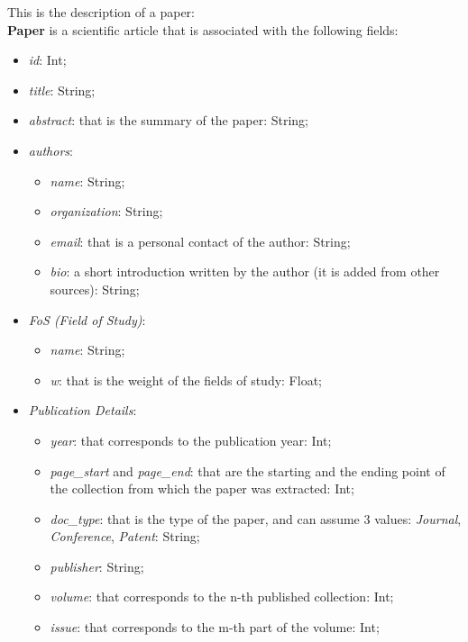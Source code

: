 \documentclass{Configuration_Files/PoliMi3i_thesis}
\begin{document}
This is the description of a paper:\\
\textbf{Paper} is a scientific article that is associated with the following fields:
    \begin{itemize}
        \item \textit{id}: Int;
        \item \textit{title}: String;
        \item \textit{abstract}: that is the summary of the paper: String;
        \item \textit{authors}:
            \begin{itemize}
              \item \textit{name}: String;
              \item \textit{organization}: String;
               \item \textit{email}: that is a personal contact of the author: String;
               \item \textit{bio}: a short introduction written by the author (it is added from other sources): String;
            \end{itemize}
        \item \textit{FoS (Field of Study)}:
            \begin{itemize}
              \item \textit{name}: String;
              \item \textit{w}:  that is the weight of the fields of study: Float;
            \end{itemize}
        \item \textit{Publication Details}:
            \begin{itemize}
              \item \textit{year}: that corresponds to the publication year: Int;
              \item \textit{page\_start} and \textit{page\_end}: that are the starting and the ending point of the collection from which the paper was extracted: Int;
              \item \textit{doc\_type}: that is the type of the paper, and can assume 3 values: \textit{Journal}, \textit{Conference}, \textit{Patent}: String;
                \item \textit{publisher}: String;
              \item \textit{volume}: that corresponds to the n-th published collection: Int;
              \item \textit{issue}: that corresponds to the m-th part of the volume: Int;

\end{itemize}
\end{itemize}
\end{document}
